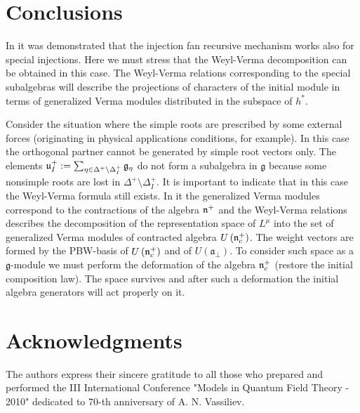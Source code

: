\documentclass[12pt]{article}
\theoremstyle{definition}
\newcommand{\gf}{\mathfrak{g}}
\newcommand{\afb}{\mathfrak{a}_{\bot}}
\begin{document}



\section{Conclusions}

\label{sec:conclusions}


In \cite{2010arXiv1007.0318L} it was demonstrated that the injection fan recursive mechanism
works also for special injections. Here we must stress that the Weyl-Verma decomposition
can be obtained in this case. The Weyl-Verma relations corresponding to the special
subalgebras will describe the projections of characters of the initial module in terms
of generalized Verma modules distributed in the subspace of $h^*$.


Consider the situation where the simple roots are prescribed by some external
forces (originating in physical applications conditions, for example). In this case
the orthogonal partner cannot be generated by simple root vectors only.  The elements
$\frak{u}_{I}^{+}:=\sum_{\eta \in \Delta ^{+}\setminus \Delta _{I}^{+}}\gf%
_{\eta }$ do not form a subalgebra in $\gf$ because some nonsimple roots are lost in
$\Delta ^{+}\setminus \Delta _{I}^{+}$. It is important to indicate that in this case
the Weyl-Verma formula still exists. In it the generalized Verma modules correspond to
the contractions \cite{Doebner1967Melsheimer} of the algebra $\frak{n}^{+}$ and the
Weyl-Verma relations describes the decomposition of the representation space of $L^{\mu}$
into the set of generalized Verma modules of contracted algebra
$U\left(\frak{n}_c^{+}\right)$. The weight vectors are formed by the PBW-basis
of $U\left(\frak{n}_c^{+}\right)$ and of $U\left( \afb \right)$. To consider such space
as a $\gf$-module we must perform the deformation \cite{Nijenhuis1966Richardson} of
the algebra $\frak{n}_c^{+}$ (restore the initial composition law). The space survives
and after such a deformation the initial
algebra generators will act properly on it.



\section{Acknowledgments}
The authors express their sincere gratitude to all those who prepared and performed the
III International Conference "Models in Quantum Field Theory - 2010" dedicated to 70-th
anniversary of A. N. Vassiliev.
\end{document}
